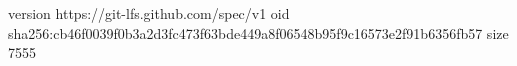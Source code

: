 version https://git-lfs.github.com/spec/v1
oid sha256:cb46f0039f0b3a2d3fc473f63bde449a8f06548b95f9c16573e2f91b6356fb57
size 7555
